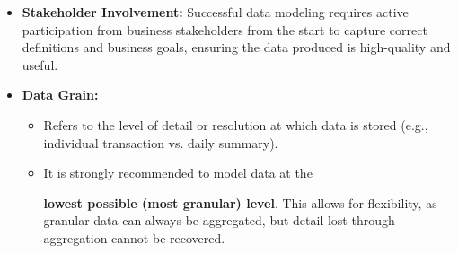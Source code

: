 \begin{itemize}
    \item \textbf{Stakeholder Involvement:} Successful data
    modeling requires active participation from business
    stakeholders from the start to capture correct definitions
    and business goals, ensuring the data produced is high-quality
    and useful.

    \item \textbf{Data Grain:}
    \begin{itemize}
        \item Refers to the level of detail or resolution
        at which data is stored (e.g., individual transaction
        vs. daily summary).
        \item It is strongly recommended to model data at the
        
        \textbf{lowest possible (most granular) level}. This
        allows for flexibility, as granular data can always be
        aggregated, but detail lost through aggregation cannot
        be recovered.
    \end{itemize}
\end{itemize}



